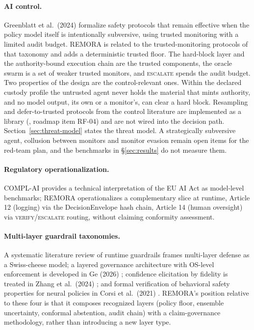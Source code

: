 \documentclass[10pt,twocolumn]{article}
\begin{document}
\paragraph{AI control.}
Greenblatt et al.\ (2024) \cite{greenblatt2024aicontrol} formalize safety
protocols that remain effective when the policy model itself is
intentionally subversive, using trusted monitoring with a limited audit
budget. REMORA is related to the trusted-monitoring protocols of that
taxonomy and adds a deterministic trusted floor. The hard-block layer and
the authority-bound
execution chain are the trusted components, the oracle swarm is a set of
weaker trusted monitors, and \textsc{escalate} spends the audit budget. Two
properties of the design are the control-relevant ones. Within the declared
custody profile the untrusted agent never holds the material that mints
authority, and no model output, its own or a monitor's, can clear a hard
block. Resampling and defer-to-trusted protocols from the control literature
are implemented as a library (,
roadmap item RF-04) and are not wired into the decision path.
Section~\ref{sec:threat-model} states the threat model. A strategically
subversive agent, collusion between monitors and monitor evasion remain
open items for the red-team plan, and the benchmarks in
\S\ref{sec:results} do not measure them.

\paragraph{Regulatory operationalization.}
COMPL-AI \cite{guldimann2024complai} provides a technical interpretation
of the EU AI Act as model-level benchmarks; REMORA operationalizes a
complementary slice at runtime, Article 12 (logging) via the
DecisionEnvelope hash chain, Article 14 (human oversight) via
\textsc{verify}/\textsc{escalate} routing, without claiming conformity
assessment.

\paragraph{Multi-layer guardrail taxonomies.}
A systematic literature review of runtime guardrails
\cite{shamsujjoha2024taxonomy} frames multi-layer defense as a
Swiss-cheese model; a layered governance architecture with OS-level
enforcement is developed in Ge (2026) \cite{ge2026governance}; confidence
elicitation by fidelity is treated in Zhang et al.\ (2024)
\cite{zhang2024fidelity}; and formal verification of behavioral safety
properties for neural policies in Corsi et al.\ (2021)
\cite{corsi2021formal}. REMORA's position relative to these four is that
it composes recognized layers (policy floor, ensemble uncertainty,
conformal abstention, audit chain) with a claim-governance methodology,
rather than introducing a new layer type.
\end{document}

